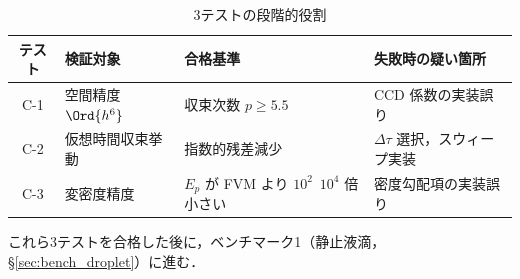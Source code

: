 \begin{table}[ht]
\centering
\caption{3テストの段階的役割}
\label{tab:three_tests_role}
\renewcommand{\arraystretch}{1.3}
\begin{tabular}{clll}
\hline
テスト & 検証対象 & 合格基準 & 失敗時の疑い箇所 \\
\hline
C-1 & 空間精度 $\Ord{h^6}$ & 収束次数 $p \ge 5.5$ & CCD 係数の実装誤り \\
C-2 & 仮想時間収束挙動 & 指数的残差減少 & $\Delta\tau$ 選択，スウィープ実装 \\
C-3 & 変密度精度 & $E_p$ が FVM より $10^2$~$10^4$ 倍小さい & 密度勾配項の実装誤り \\
\hline
\end{tabular}
\end{table}

これら3テストを合格した後に，ベンチマーク1（静止液滴，§\ref{sec:bench_droplet}）に進む．
